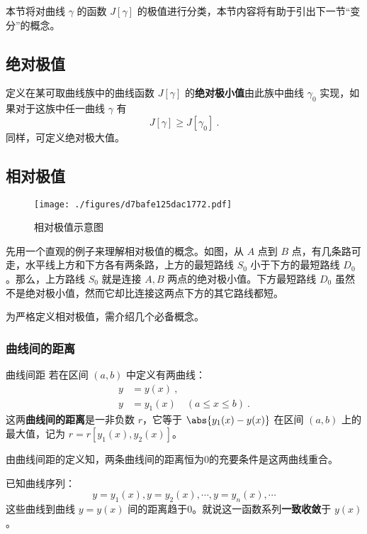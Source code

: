 

本节将对曲线 $\gamma$ 的函数 $J[\gamma]$ 的极值进行分类，本节内容将有助于引出下一节“变分”的概念。

\subsection{绝对极值}
定义在某可取曲线族中的曲线函数 $J[\gamma]$ 的\textbf{绝对极小值}由此族中曲线 $\gamma_0$ 实现，如果对于这族中任一曲线 $\gamma$ 有
\begin{equation}
J[\gamma]\geq J[\gamma_0]~.
\end{equation}
同样，可定义绝对极大值。
\subsection{相对极值}\label{sub_AbPol_1}
\begin{figure}[ht]
\centering
\texttt{[image: ./figures/d7bafe125dac1772.pdf]}
\caption{相对极值示意图} \label{fig_AbPol_1}
\end{figure}

先用一个直观的例子来理解相对极值的概念。如图，从 $A$ 点到 $B$ 点，有几条路可走，水平线上方和下方各有两条路，上方的最短路线 $S_0$ 小于下方的最短路线 $D_0$ 。那么，上方路线 $S_0$ 就是连接 $A,B$ 两点的绝对极小值。下方最短路线 $D_0$ 虽然不是绝对极小值，然而它却比连接这两点下方的其它路线都短。 

为严格定义相对极值，需介绍几个必备概念。
\subsubsection{曲线间的距离}
\begin{definition}{曲线间距}
若在区间 $(a,b)$ 中定义有两曲线：
\begin{equation}
\begin{aligned}
y&=y(x)~,\\
y&=y_1(x)\quad(a\leq x\leq b)~.
\end{aligned}
\end{equation}
这两\textbf{曲线间的距离}是一非负数 $r$，它等于 $\abs{y_1(x)-y(x)}$ 在区间 $(a,b)$ 上的最大值，记为 $r=r[y_1(x),y_2(x)]$。
\end{definition}
由曲线间距的定义知，两条曲线间的距离恒为0的充要条件是这两曲线重合。

已知曲线序列：
\begin{equation}
y=y_1(x),y=y_2(x),\cdots,y=y_n(x),\cdots
\end{equation}
这些曲线到曲线 $y=y(x)$ 间的距离趋于0。就说这一函数系列\textbf{一致收敛}于 $y(x)$。

